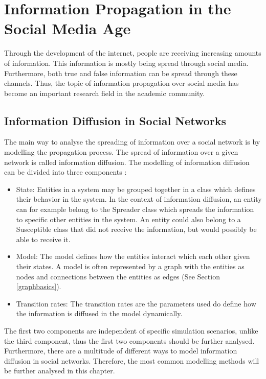 \section{Information Propagation in the Social Media Age}

Through the development of the internet, 
people are receiving increasing amounts of information.
This information is mostly being spread through social media.
Furthermore, both true and false information can be spread through 
these channels.
Thus, the topic of information propagation over social media has become an 
important research field in the academic community.

\subsection{Information Diffusion in Social Networks}

The main way to analyse the spreading of information over a social network 
is by modelling the propagation process. The spread of information over 
a given network is called information diffusion. 
The modelling of information diffusion can be divided into three components
\cite{reviewinformationdiffusion}: 

\begin{itemize}
    \item State: Entities in a system may be grouped together in a class which
    defines their behavior in the system. In the context of information diffusion,
    an entity can for example belong to the  \glqq Spreader \grqq{} class which spreads the information
    to specific other entities in the system. An entity could also belong to a
    \glqq Susceptible \grqq{} class that did not receive the information, 
    but would possibly be able to receive it.
    \item Model: The model defines how the entities interact which each other
    given their states. A model is often represented by a graph with the entities
    as nodes and connections between the entities as edges 
    (See Section \ref{graphbasics}).
    \item Transition rates: The transition rates are the parameters used
    do define how the information is diffused in the model dynamically. 
\end{itemize}

The first two components are independent of specific simulation scenarios,
unlike the third component, thus the first two components should be further
analysed. Furthermore, there are a multitude of different ways 
to model information diffusion in social networks. Therefore, the most common
modelling methods will be further analysed in this chapter.

